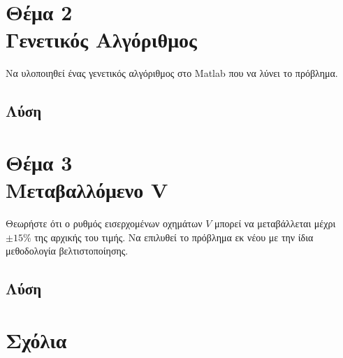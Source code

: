 \documentclass[twocolumn]{report}
\begin{document}
\section*{Θέμα 2\\Γενετικός Αλγόριθμος}
Να υλοποιηθεί ένας γενετικός αλγόριθμος στο 
Matlab που να λύνει το πρόβλημα.
\subsection*{Λύση}


\section*{Θέμα 3\\Μεταβαλλόμενο V}
Θεωρήστε ότι ο ρυθμός εισερχομένων οχημάτων $V$ μπορεί να μεταβάλλεται μέχρι 
$\pm 15\%$ της αρχικής του τιμής. Να επιλυθεί το πρόβλημα εκ νέου με 
την ίδια μεθοδολογία βελτιστοποίησης. 
\subsection*{Λύση}

\section*{Σχόλια}

\end{document}
